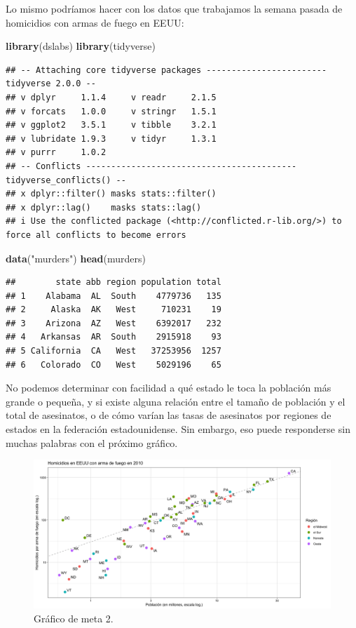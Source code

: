 \documentclass[
]{article}
\newenvironment{Shaded}{\begin{snugshade}}{\end{snugshade}}
\newcommand{\FunctionTok}[1]{\textcolor[rgb]{0.13,0.29,0.53}{\textbf{#1}}}
\newcommand{\NormalTok}[1]{#1}
\newcommand{\StringTok}[1]{\textcolor[rgb]{0.31,0.60,0.02}{#1}}
\begin{document}
Lo mismo podríamos hacer con los datos que trabajamos la semana pasada
de homicidios con armas de fuego en EEUU:

\begin{Shaded}
\begin{Highlighting}[]
\FunctionTok{library}\NormalTok{(dslabs)}
\FunctionTok{library}\NormalTok{(tidyverse)}
\end{Highlighting}
\end{Shaded}

\begin{verbatim}
## -- Attaching core tidyverse packages ------------------------ tidyverse 2.0.0 --
## v dplyr     1.1.4     v readr     2.1.5
## v forcats   1.0.0     v stringr   1.5.1
## v ggplot2   3.5.1     v tibble    3.2.1
## v lubridate 1.9.3     v tidyr     1.3.1
## v purrr     1.0.2     
## -- Conflicts ------------------------------------------ tidyverse_conflicts() --
## x dplyr::filter() masks stats::filter()
## x dplyr::lag()    masks stats::lag()
## i Use the conflicted package (<http://conflicted.r-lib.org/>) to force all conflicts to become errors
\end{verbatim}

\begin{Shaded}
\begin{Highlighting}[]
\FunctionTok{data}\NormalTok{(}\StringTok{"murders"}\NormalTok{)}
\FunctionTok{head}\NormalTok{(murders)}
\end{Highlighting}
\end{Shaded}

\begin{verbatim}
##        state abb region population total
## 1    Alabama  AL  South    4779736   135
## 2     Alaska  AK   West     710231    19
## 3    Arizona  AZ   West    6392017   232
## 4   Arkansas  AR  South    2915918    93
## 5 California  CA   West   37253956  1257
## 6   Colorado  CO   West    5029196    65
\end{verbatim}

No podemos determinar con facilidad a qué estado le toca la población
más grande o pequeña, y si existe alguna relación entre el tamaño de
población y el total de asesinatos, o de cómo varían las tasas de
asesinatos por regiones de estados en la federación estadounidense. Sin
embargo, eso puede responderse sin muchas palabras con el próximo
gráfico.

\begin{figure}
\centering
\includegraphics{Meta.png}
\caption{Gráfico de meta 2.}
\end{figure}
\end{document}
